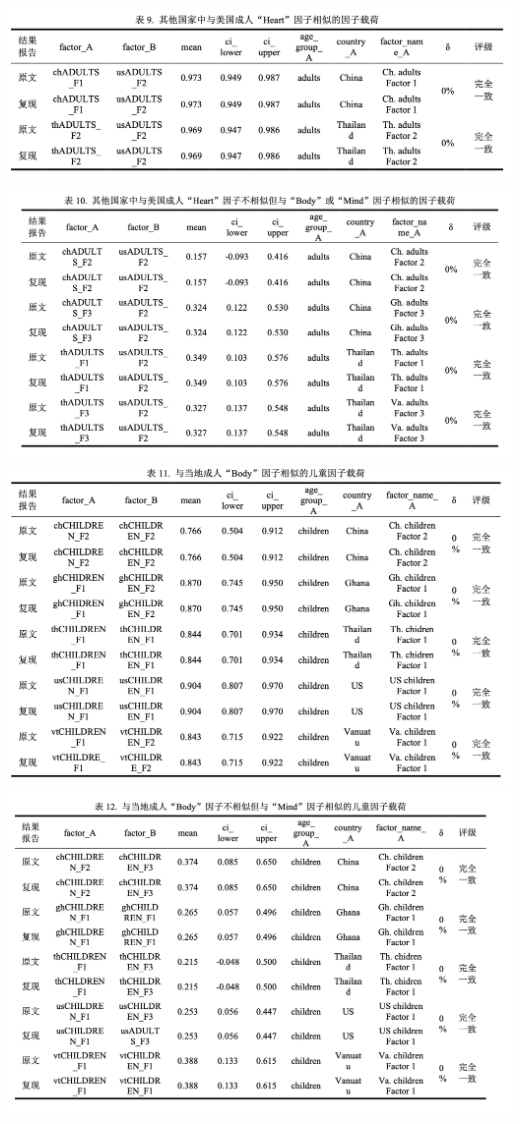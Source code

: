 \documentclass[
  man]{apa6}
\begin{document}
\includegraphics{./Script_Re_Weisman_2021_Group1_2024_files/Repeatability_figures/table9.png}
\includegraphics{./Script_Re_Weisman_2021_Group1_2024_files/Repeatability_figures/table10.png}
\includegraphics{./Script_Re_Weisman_2021_Group1_2024_files/Repeatability_figures/table11.png}
\includegraphics{./Script_Re_Weisman_2021_Group1_2024_files/Repeatability_figures/table12.png}
\end{document}
